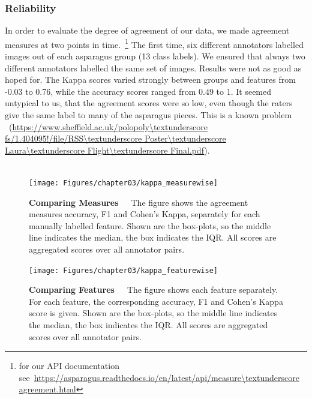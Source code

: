 {\subsubsection{Reliability}
\label{subsec:Reliability}

In order to evaluate the degree of agreement of our data, we made agreement measures at two points in time.~\footnote{for our API documentation see~\url{https://asparagus.readthedocs.io/en/latest/api/measure\textunderscore agreement.html}} The first time, six different annotators labelled images out of each asparagus group (13 class labels). We ensured that always two different annotators labelled the same set of images. Results were not as good as hoped for. The Kappa scores varied strongly between groups and features from -0.03 to 0.76, while the accuracy scores ranged from 0.49 to 1. It seemed untypical to us, that the agreement scores were so low, even though the raters give the same label to many of the asparagus pieces. This is a known problem~\citep{powers2012problem} ~\citep{sim2005kappa} ~\citep{feinstein1990high}(\url{https://www.sheffield.ac.uk/polopoly\textunderscore fs/1.404095!/file/RSS\textunderscore Poster\textunderscore Laura\textunderscore Flight\textunderscore Final.pdf}). \\
\\
\begin{figure}[h]
	\centering
	\texttt{[image: Figures/chapter03/kappa\_measurewise]}
	\decoRule
	\caption[Agreement Measure-Wise Comparison of all Features]{\textbf{Comparing Measures}~~~The figure shows the agreement measures accuracy, F1 and Cohen’s Kappa, separately for each manually labelled feature. Shown are the box-plots, so the middle line indicates the median, the box indicates the IQR. All scores are aggregated scores over all annotator pairs.}
	\label{fig:KappaMeasurewise}
\end{figure}

\begin{figure}[h]
	\centering
	\texttt{[image: Figures/chapter03/kappa\_featurewise]}
	\decoRule
	\caption[Feature-Wise Comparison of Agreement Measure Scores]{\textbf{Comparing Features}~~~The figure shows each feature separately. For each feature, the corresponding accuracy, F1 and Cohen’s Kappa score is given. Shown are the box-plots, so the middle line indicates the median, the box indicates the IQR. All scores are aggregated scores over all annotator pairs.}
	\label{fig:KappaFeaturewise}
\end{figure}

}
